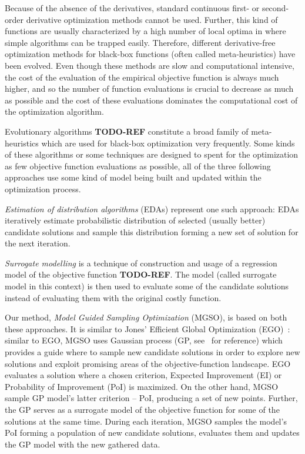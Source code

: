 \documentclass{itatnew}
\begin{document}
Because of the absence of the derivatives, standard continuous first- or second-order derivative optimization methods cannot be used. Further, this kind of functions are usually characterized by a high number of local optima in where simple algorithms can be trapped easily. Therefore, different derivative-free optimization methods for black-box functions (often called meta-heuristics) have been evolved. Even though these methods are slow and computational intensive, the cost of the evaluation of the empirical objective function is always much higher, and so the number of function evaluations is crucial to decrease as much as possible and the cost of these evaluations dominates the computational cost of the optimization algorithm.

Evolutionary algorithms \textbf{TODO-REF} constitute a broad family of meta-heuristics which are used for black-box optimization very frequently. Some kinds of these algorithms or some techniques are designed to spent for the optimization as few objective function evaluations as possible, all of the three following approaches use some kind of model being built and updated within the optimization process.

\emph{Estimation of distribution algorithms} (EDAs) \cite{larranaga_estimation_2002} represent one such approach: EDAs iteratively estimate probabilistic distribution of selected (usually better) candidate solutions and sample this distribution forming a new set of solution for the next iteration. 

\emph{Surrogate modelling} is a technique of construction and usage of a regression model of the objective function \textbf{TODO-REF}. The model (called surrogate model in this context) is then used to evaluate some of the candidate solutions instead of evaluating them with the original costly function.

Our method, \emph{Model Guided Sampling Optimization} (MGSO), is based on both these approaches. It is similar to Jones' Efficient Global Optimization (EGO)~\cite{jones_efficient_1998}: similar to EGO, MGSO uses Gaussian process (GP, see~\cite{rasmussen_gaussian_2006} for reference) which provides a guide where to sample new candidate solutions in order to explore new solutions and exploit promising areas of the objective-function landscape. EGO evaluates a solution where a chosen criterion, Expected Improvement (EI) or Probability of Improvement (PoI) is maximized. On the other hand, MGSO sample GP model's latter criterion -- PoI, producing a set of new points. Further, the GP serves as a surrogate model of the objective function for some of the solutions at the same time. During each iteration, MGSO samples the model's PoI forming a population of new candidate solutions, evaluates them and updates the GP model with the new gathered data.
\end{document}
